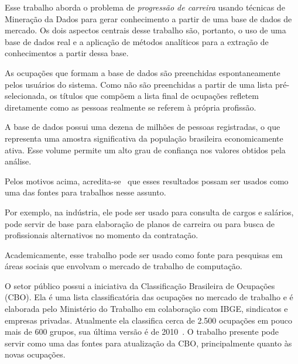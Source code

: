 \documentclass[12pt,a4paper]{article}
\begin{document}

Esse trabalho aborda o problema de \textit{progressão de carreira} usando técnicas de Mineração da Dados para gerar conhecimento a partir de uma base de dados de mercado. Os dois aspectos centrais desse trabalho são, portanto, o uso de uma base de dados real e a aplicação de métodos analíticos para a extração de conhecimentos a partir dessa base.


As ocupações que formam a base de dados são preenchidas espontaneamente pelos usuários do sistema. Como não são preenchidas a partir de uma lista pré-selecionada, os títulos que compõem a lista final de ocupações refletem diretamente como as pessoas realmente se referem à própria profissão. %

A base de dados possui uma dezena de milhões de pessoas registradas, o que representa uma amostra significativa da população brasileira economicamente ativa. Esse volume permite um alto grau de confiança nos valores obtidos pela análise.



Pelos motivos acima, acredita-se~ que esses resultados possam ser usados como uma das fontes para trabalhos nesse assunto.

Por exemplo, na indústria, ele pode ser usado para consulta de cargos e salários, pode servir de base para elaboração de planos de carreira ou para busca de profissionais alternativos no momento da contratação.

Academicamente, esse trabalho pode ser usado como fonte para pesquisas em áreas sociais que envolvam o mercado de trabalho de computação.

O setor público possui a iniciativa da Classificação Brasileira de Ocupações (CBO). Ela é uma lista classificatória das ocupações no mercado de trabalho e é elaborada pelo Ministério do Trabalho em colaboração com IBGE, sindicatos e empresas privadas. Atualmente ela classifica cerca de 2.500 ocupações em pouco mais de 600 grupos, sua última versão é de 2010~\cite{mte-cbo-tc}. O trabalho presente pode servir como uma das fontes para atualização da CBO, principalmente quanto às novas ocupações.
\end{document}
